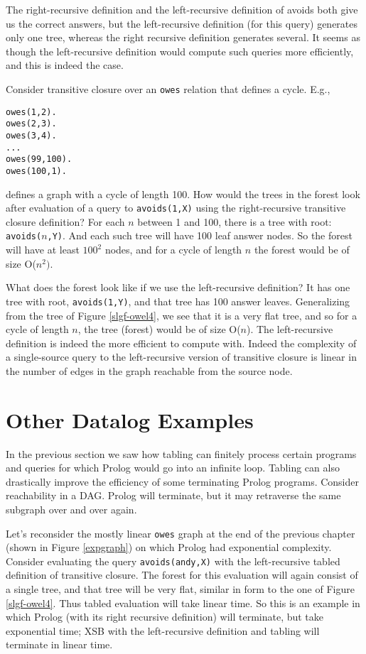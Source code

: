 The right-recursive definition and the left-recursive definition of
avoids both give us the correct answers, but the left-recursive
definition (for this query) generates only one tree, whereas the right
recursive definition generates several.  It seems as though the
left-recursive definition would compute such queries more efficiently,
and this is indeed the case.

Consider transitive closure over an \verb|owes| relation that defines
a cycle.  E.g.,
\begin{verbatim}
owes(1,2).
owes(2,3).
owes(3,4).
...
owes(99,100).
owes(100,1).
\end{verbatim}
defines a graph with a cycle of length 100.  How would the trees in
the forest look after evaluation of a query to \verb|avoids(1,X)|
using the right-recursive transitive closure definition?  For each $n$
between 1 and 100, there is a tree with root:
\verb|avoids(|$n$\verb|,Y)|.  And each such tree will have 100 leaf
answer nodes.  So the forest will have at least $100^2$ nodes, and for
a cycle of length $n$ the forest would be of size O($n^2)$.

What does the forest look like if we use the left-recursive
definition?  It has one tree with root, \verb|avoids(1,Y)|, and that
tree has 100 answer leaves.  Generalizing from the tree of Figure
\ref{slgf-owel4}, we see that it is a very flat tree, and so for a
cycle of length $n$, the tree (forest) would be of size O($n$).  The
left-recursive definition is indeed the more efficient to compute
with.  Indeed the complexity of a single-source query to the
left-recursive version of transitive closure is linear in the number
of edges in the graph reachable from the source node.

\section{Other Datalog Examples}

In the previous section we saw how tabling can finitely process
certain programs and queries for which Prolog would go into an
infinite loop.  Tabling can also drastically improve the efficiency of
some terminating Prolog programs.  Consider reachability in a DAG.
Prolog will terminate, but it may retraverse the same subgraph over
and over again.

Let's reconsider the mostly linear \verb|owes| graph at the end of the
previous chapter (shown in Figure \ref{expgraph}) on which Prolog had
exponential complexity.  Consider evaluating the query
\verb|avoids(andy,X)| with the left-recursive tabled definition of 
transitive closure.  The forest for this evaluation will again consist
of a single tree, and that tree will be very flat, similar in form to
the one of Figure \ref{slgf-owel4}.  Thus tabled evaluation will take
linear time.  So this is an example in which Prolog (with its right
recursive definition) will terminate, but take exponential time; XSB
with the left-recursive definition and tabling will terminate in
linear time.

